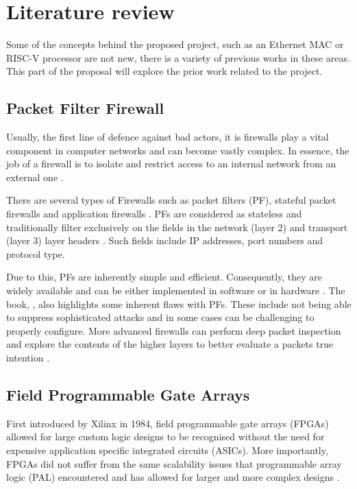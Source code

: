 \chapter[Literature review]{Literature review }
\label{Chap:label}	%
\pagestyle{headings}



Some of the concepts behind the proposed project, such as an Ethernet MAC or RISC-V processor are not new, there is a variety of previous works in these areas. This part of the proposal will explore the prior work related to the project. 




\section{Packet Filter Firewall}

Usually, the first line of defence against bad actors, it is firewalls play a vital component in computer networks and can become vastly complex. 
In essence, the job of a firewall is to isolate and restrict access to an internal network from an external one \cite{BuildingInternetFirewalls}.

There are several types of Firewalls such as packet filters (PF), stateful packet firewalls and application firewalls \cite{FirewallsBook}. 
PFs are considered as stateless and traditionally filter exclusively on the fields in the network (layer 2) and transport 
(layer 3) layer headers \cite{FirewallsBook}. Such fields include IP addresses, port numbers and protocol type.

Due to this, PFs are inherently simple and efficient. Consequently, they are widely available and can be either implemented in software or in 
hardware \cite{BuildingInternetFirewalls}. The book, \cite{BuildingInternetFirewalls}, also highlights some inherent flaws with PFs. These include not being able 
to suppress sophisticated attacks and in some cases can be challenging to properly configure. More advanced firewalls can perform deep packet inspection and 
explore the contents of the higher layers to better evaluate a packets true intention \cite{FirewallsBook}. 




\section{Field Programmable Gate Arrays}
First introduced by Xilinx in 1984, field programmable gate arrays (FPGAs) allowed for large custom logic designs to be recognised without the need for 
expensive application specific integrated circuits (ASICs). More importantly, FPGAs did not suffer from the same scalability issues that
programmable array logic (PAL) encountered and has allowed for larger and more complex designs \cite{30YearsOfFPGA}. 

